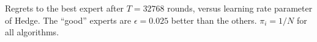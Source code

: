 \documentclass[30pt,landscape]{sciposter}
\begin{document}
\begin{multicols}{3}
{\footnotesize{Regrets to the best expert after $T = 32768$ rounds,
versus learning rate parameter of Hedge. The ``good'' experts
are $\epsilon=0.025$ better than the others. $\pi_i=1/N$ for all
algorithms.}
}
\end{multicols}
\end{document}
